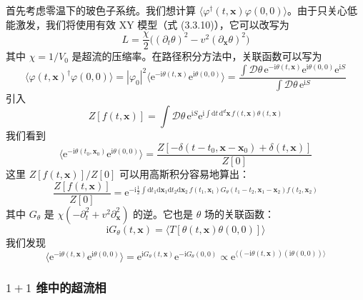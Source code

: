 首先考虑零温下的玻色子系统。我们想计算 $\langle\varphi^{\dagger}(t,\pmb{x})\varphi(0,0)\rangle$。由于只关心低能激发，我们将使用有效 XY 模型（式 (3.3.10)），它可以改写为
\begin{equation*}
L=\frac{\chi}{2}\big((\partial_t\theta)^2-v^2(\partial_{\pmb{x}}\theta)^2\big) \tag{3.3.23}
\end{equation*}
其中 $\chi=1/V_0$ 是超流的压缩率。在路径积分方法中，关联函数可以写为
\begin{equation*}
\big\langle\varphi(t,\pmb{x})^{\dagger}\varphi(0,0)\big\rangle=|\varphi_0|^2\big\langle\mathrm{e}^{-\mathrm{i}\theta(t,\pmb{x})}\mathrm{e}^{\mathrm{i}\theta(0,0)}\big\rangle=\frac{\int\mathcal{D}\theta\,\mathrm{e}^{-\mathrm{i}\theta(t,\pmb{x})}\mathrm{e}^{\mathrm{i}\theta(0,0)}\mathrm{e}^{\mathrm{i}S}}{\int\mathcal{D}\theta\,\mathrm{e}^{\mathrm{i}S}}
\end{equation*}
引入
\begin{equation*}
Z[f(t,\pmb{x})]=\int\mathcal{D}\theta\,\mathrm{e}^{\mathrm{i}S}\mathrm{e}^{\mathrm{i}\int\mathrm{d}t\,\mathrm{d}^d\pmb{x}\,f(t,\pmb{x})\theta(t,\pmb{x})}
\end{equation*}
我们看到
\begin{equation*}
\big\langle\mathrm{e}^{-\mathrm{i}\theta(t_0,\pmb{x}_0)}\mathrm{e}^{\mathrm{i}\theta(0,0)}\big\rangle=\frac{Z[-\delta(t-t_0,\pmb{x}-\pmb{x}_0)+\delta(t,\pmb{x})]}{Z[0]}
\end{equation*}
这里 $Z[f(t,\pmb{x})]/Z[0]$ 可以用高斯积分容易地算出：
\begin{equation*}
\frac{Z[f(t,\pmb{x})]}{Z[0]}=\mathrm{e}^{-\mathrm{i}\frac{1}{2}\int\mathrm{d}t_1\mathrm{d}\pmb{x}_1\mathrm{d}t_2\mathrm{d}\pmb{x}_2\,f(t_1,\pmb{x}_1)G_{\theta}(t_1-t_2,\pmb{x}_1-\pmb{x}_2)f(t_2,\pmb{x}_2)}
\end{equation*}
其中 $G_{\theta}$ 是 $\chi(-\partial_t^2+v^2\partial_{\pmb{x}}^2)$ 的逆。它也是 $\theta$ 场的关联函数：
\begin{equation*}
\mathrm{i}G_{\theta}(t,\pmb{x})=\langle T[\theta(t,\pmb{x})\theta(0,0)]\rangle
\end{equation*}
我们发现
\begin{equation*}
\big\langle\mathrm{e}^{-\mathrm{i}\theta(t,\pmb{x})}\mathrm{e}^{\mathrm{i}\theta(0,0)}\big\rangle=\mathrm{e}^{\mathrm{i}G_{\theta}(t,\pmb{x})}\mathrm{e}^{-\mathrm{i}G_{\theta}(0,0)}\propto\mathrm{e}^{\langle(-\mathrm{i}\theta(t,\pmb{x}))(\mathrm{i}\theta(0,0))\rangle}
\end{equation*}

\subsubsection{$1+1$ 维中的超流相}

